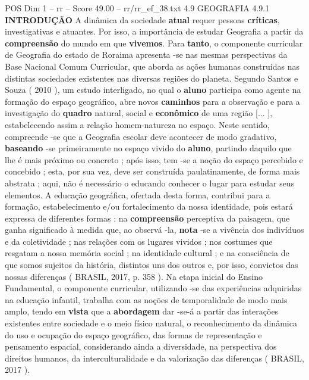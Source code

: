 \begin{textsample}{POS Dim 1 – rr – Score 49.00 – rr/rr\_ef\_38.txt}  \label{ex:f1_pos_215}
4.9 GEOGRAFIA 4.9.1 \textbf{INTRODUÇÃO} A dinâmica da sociedade \textbf{atual} requer pessoas \textbf{críticas}, investigativas e atuantes.
Por isso, a importância de estudar Geografia a partir da \textbf{compreensão} do mundo em que \textbf{vivemos}.
Para \textbf{tanto}, o componente curricular de Geografia do estado de Roraima apresenta -se nas mesmas perspectivas da Base Nacional Comum Curricular, que aborda as ações humanas construídas nas distintas sociedades existentes nas diversas regiões do planeta.
Segundo Santos e Souza ( 2010 ), um estudo interligado, no qual o \textbf{aluno} participa como agente na formação do espaço geográfico, abre novos \textbf{caminhos} para a observação e para a investigação do \textbf{quadro} natural, social e \textbf{econômico} de uma região [... ], estabelecendo assim a relação homem-natureza no espaço.
Neste sentido, compreende -se que a Geografia escolar deve acontecer de modo gradativo, \textbf{baseando} -se primeiramente no espaço vivido do \textbf{aluno}, partindo daquilo que lhe é mais próximo ou concreto ; após isso, tem -se a noção do espaço percebido e concebido ; esta, por sua vez, deve ser construída paulatinamente, de forma mais abstrata ; aqui, não é necessário o educando conhecer o lugar para estudar seus elementos.
A educação geográfica, ofertada desta forma, contribui para a formação, estabelecimento e/ou fortalecimento da nossa identidade, pois estará expressa de diferentes formas : na \textbf{compreensão} perceptiva da paisagem, que ganha significado à medida que, ao observá -la, \textbf{nota} -se a vivência dos indivíduos e da coletividade ; nas relações com os lugares vividos ; nos costumes que resgatam a nossa memória social ; na identidade cultural ; e na consciência de que somos sujeitos da história, distintos uns dos outros e, por isso, convictos das nossas diferenças ( BRASIL, 2017, p. 358 ).
Na etapa inicial do Ensino Fundamental, o componente curricular, utilizando -se das experiências adquiridas na educação infantil, trabalha com as noções de temporalidade de modo mais amplo, tendo em \textbf{vista} que a \textbf{abordagem} dar -se-á a partir das interações existentes entre sociedade e o meio físico natural, o reconhecimento da dinâmica do uso e ocupação do espaço geográfico, das formas de representação e pensamento espacial, considerando ainda a diversidade, na perspectiva dos direitos humanos, da interculturalidade e da valorização das diferenças ( BRASIL, 2017 ).

\end{textsample}
